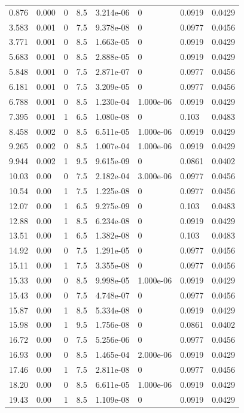 \documentclass[preview]{standalone}
\begin{document}
{{\begin{tabular}{L{1.2cm}C{1.2cm} C{0.3cm}C{0.5cm} C{1.4cm}C{1.4cm} C{1.4cm}C{1.4cm}}
  0.876  &  0.000  & 0     & 8.5 &  3.214e-06  & 0  & 0.0919 &  0.0429   \\ 
  3.583  &  0.001  & 0     & 7.5 &  9.378e-08  & 0  & 0.0977 &  0.0456   \\ 
  3.771  &  0.001  & 0     & 8.5 &  1.663e-05  & 0  & 0.0919 &  0.0429   \\ 
  5.683  &  0.001  & 0     & 8.5 &  2.888e-05  & 0  & 0.0919 &  0.0429   \\ 
  5.848  &  0.001  & 0     & 7.5 &  2.871e-07  & 0  & 0.0977 &  0.0456   \\ 
  6.181  &  0.001  & 0     & 7.5 &  3.209e-05  & 0  & 0.0977 &  0.0456   \\ 
  6.788  &  0.001  & 0     & 8.5 &  1.230e-04  & 1.000e-06  & 0.0919 &  0.0429   \\ 
  7.395  &  0.001  & 1     & 6.5 &  1.080e-08  & 0  & 0.103 &  0.0483   \\ 
  8.458  &  0.002  & 0     & 8.5 &  6.511e-05  & 1.000e-06  & 0.0919 &  0.0429   \\ 
  9.265  &  0.002  & 0     & 8.5 &  1.007e-04  & 1.000e-06  & 0.0919 &  0.0429   \\ 
  9.944  &  0.002  & 1     & 9.5 &  9.615e-09  & 0  & 0.0861 &  0.0402   \\ 
  10.03  &  0.00  & 0     & 7.5 &  2.182e-04  & 3.000e-06  & 0.0977 &  0.0456   \\ 
  10.54  &  0.00  & 1     & 7.5 &  1.225e-08  & 0  & 0.0977 &  0.0456   \\ 
  12.07  &  0.00  & 1     & 6.5 &  9.275e-09  & 0  & 0.103 &  0.0483   \\ 
  12.88  &  0.00  & 1     & 8.5 &  6.234e-08  & 0  & 0.0919 &  0.0429   \\ 
  13.51  &  0.00  & 1     & 6.5 &  1.382e-08  & 0  & 0.103 &  0.0483   \\ 
  14.92  &  0.00  & 0     & 7.5 &  1.291e-05  & 0  & 0.0977 &  0.0456   \\ 
  15.11  &  0.00  & 1     & 7.5 &  3.355e-08  & 0  & 0.0977 &  0.0456   \\ 
  15.33  &  0.00  & 0     & 8.5 &  9.998e-05  & 1.000e-06  & 0.0919 &  0.0429   \\ 
  15.43  &  0.00  & 0     & 7.5 &  4.748e-07  & 0  & 0.0977 &  0.0456   \\ 
  15.87  &  0.00  & 1     & 8.5 &  5.334e-08  & 0  & 0.0919 &  0.0429   \\ 
  15.98  &  0.00  & 1     & 9.5 &  1.756e-08  & 0  & 0.0861 &  0.0402   \\ 
  16.72  &  0.00  & 0     & 7.5 &  5.256e-06  & 0  & 0.0977 &  0.0456   \\ 
  16.93  &  0.00  & 0     & 8.5 &  1.465e-04  & 2.000e-06  & 0.0919 &  0.0429   \\ 
  17.46  &  0.00  & 1     & 7.5 &  2.811e-08  & 0  & 0.0977 &  0.0456   \\ 
  18.20  &  0.00  & 0     & 8.5 &  6.611e-05  & 1.000e-06  & 0.0919 &  0.0429   \\ 
  19.43  &  0.00  & 1     & 8.5 &  1.109e-08  & 0  & 0.0919 &  0.0429   \\ 
\hline 
\end{tabular} 

}}
\end{document}
